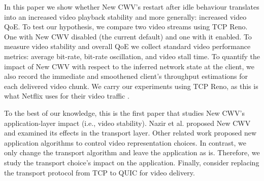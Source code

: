 \documentclass[10pt,sigconf]{acmart}
\begin{document}



In this paper we show whether New CWV's restart after idle behaviour translates into an increased video playback stability and more generally: increased video QoE. To test our hypothesis, we compare two video streams using TCP Reno. One with New CWV disabled (the current default) and one with it enabled. To measure video stability and overall QoE we collect standard video performance metrics: average bit-rate, bit-rate oscillation, and video stall time. To quantify the impact of New CWV with respect to the inferred network state at the client, we also record the immediate and smoothened client's throughput estimations for each delivered video chunk. We carry our experiments using TCP Reno, as this is what Netflix uses for their video traffic \cite{Mishra-2019-the-great-internet-tcp-congestion-control-census}.


To the best of our knowledge, this is the first paper that studies New CWV's application-layer impact (i.e., video stability). Nazir et al. \cite{Nazir-2014-performance-evaluation-congestion-window-validation-dash-newcwv} proposed New CWV and examined its effects in the transport layer. Other related work proposed new application algorithms to control video representation choices. In contrast, we only change the transport algorithm and leave the application as is. Therefore, we study the transport choice's impact on the application. Finally, \cite{Bhat-2017-not-so-quic} consider replacing the transport protocol from TCP to QUIC for video delivery. 
\end{document}
